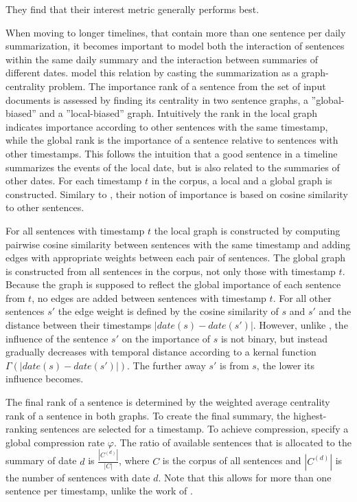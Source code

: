 \documentclass[a4paper,BCOR=10mm]{report}
\numberwithin{lemma}{chapter}
\numberwithin{definition}{chapter}
\begin{document}
They find that their interest metric generally performs best.

When moving to longer timelines, that contain more than one sentence per daily summarization, it becomes important to model both the interaction of sentences within the same daily summary and the interaction between summaries of different dates.
\citet{yan-trans} model this relation by casting the summarization as a graph-centrality problem.
The importance rank of a sentence from the set of input documents is assessed by finding its centrality in two sentence graphs, a ''global-biased'' and a ''local-biased'' graph.
Intuitively the rank in the local graph indicates importance according to other sentences with the same timestamp, while the global rank is the importance of a sentence relative to sentences with other timestamps. This follows the intuition that a good sentence in a timeline summarizes the events of the local date, but is also related to the summaries of other dates. For each timestamp $t$ in the corpus, a local and a global graph is constructed.
Similary to \citet{chieu}, their notion of importance is based on cosine similarity to other sentences.

For all sentences with timestamp $t$ the local graph is constructed by computing pairwise cosine similarity between sentences with the same timestamp and adding edges with appropriate weights between each pair of sentences.
The global graph is constructed from all sentences in the corpus, not only those with timestamp $t$. Because the graph is supposed to reflect the global importance of each sentence from $t$, no edges are added between sentences with timestamp $t$.
For all other sentences $s'$ the edge weight is defined by the cosine similarity of $s$ and $s'$ and the distance between their timestamps $|\mathit{date}(s) - \mathit{date}(s')|$. However, unlike \citet{chieu}, the influence of the sentence $s'$ on the importance of $s$ is not binary, but instead gradually decreases with temporal distance according to a kernal function $\Gamma(|\mathit{date}(s) - \mathit{date}(s')|)$. The further away $s'$ is from $s$, the lower its influence becomes.

The final rank of a sentence is determined by the weighted average centrality rank of a sentence in both graphs.
To create the final summary, the highest-ranking sentences are selected for a timestamp. To achieve compression, \citeauthor{yan-trans} specify a global compression rate $\varphi$. The ratio of available sentences that is allocated to the summary of date $d$ is $\frac{|C^{(d)}|}{|C|}$, where $C$ is the corpus of all sentences and $|C^{(d)}|$ is the number of sentences with date $d$. Note that this allows for more than one sentence per timestamp, unlike the work of \citet{chieu}.
\end{document}
